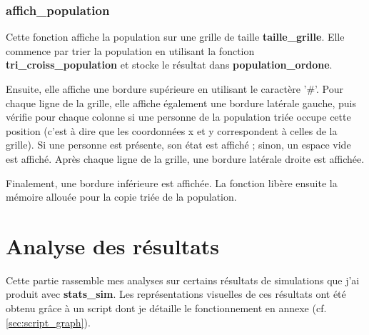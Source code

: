 \documentclass[12pt,french,titlepage]{article}
\begin{document}
\subsubsection*{affich\_population}
Cette fonction affiche la population sur une grille de taille \textbf{taille\_grille}. Elle commence par trier la population en utilisant la fonction \textbf{tri\_croiss\_population} et stocke le résultat dans \textbf{population\_ordone}.

Ensuite, elle affiche une bordure supérieure en utilisant le caractère '\#'. Pour chaque ligne de la grille, elle affiche également une bordure latérale gauche, puis vérifie pour chaque colonne si une personne de la population triée occupe cette position (c'est à dire que les coordonnées x et y correspondent à celles de la grille). Si une personne est présente, son état est affiché ; sinon, un espace vide est affiché. Après chaque ligne de la grille, une bordure latérale droite est affichée.

Finalement, une bordure inférieure est affichée. La fonction libère ensuite la mémoire allouée pour la copie triée de la population.

\newpage

\section{Analyse des résultats}
\label{sec:analyse}

Cette partie rassemble mes analyses sur certains résultats de simulations que j'ai produit avec \textbf{stats\_sim}. Les représentations visuelles de ces résultats ont été obtenu grâce à un script dont je détaille le fonctionnement en annexe (cf. \ref{sec:script_graph}). 
\end{document}
